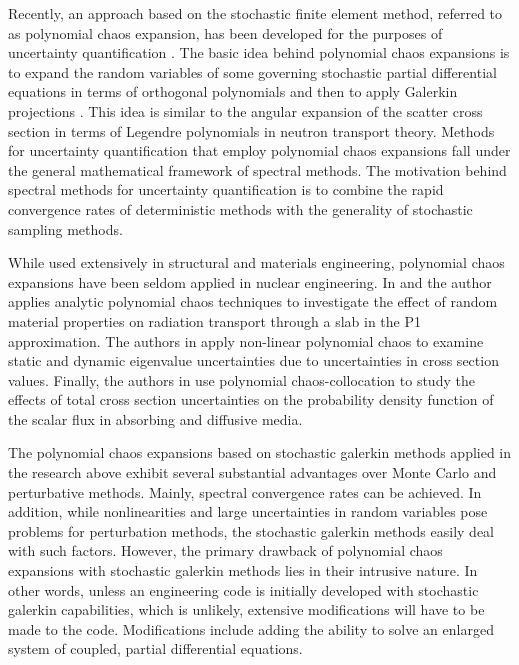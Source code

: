 Recently, an approach based on the stochastic finite element method, referred to as polynomial chaos expansion, has been developed for the purposes of uncertainty quantification \cite{Ghanem_Spanos}. The basic idea behind polynomial chaos expansions is to expand the random variables of some governing stochastic partial differential equations in terms of orthogonal polynomials and then to apply Galerkin projections \cite{LeMaitreKnio}. This idea is similar to the angular expansion of the scatter cross section in terms of Legendre polynomials in neutron transport theory. Methods for uncertainty quantification that employ polynomial chaos expansions fall under the general mathematical framework of spectral methods. The motivation behind spectral methods for uncertainty quantification is to combine the rapid convergence rates of deterministic methods with the generality of stochastic sampling methods. 

While used extensively in structural and materials engineering, polynomial chaos expansions have been seldom applied in nuclear engineering. In \cite{MMR_Williams1} and \cite{MMR_Williams2} the author applies analytic polynomial chaos techniques to investigate the effect of random material properties on radiation transport through a slab in the P1 approximation. The authors in \cite{Ayres_Williams_Eaton} apply non-linear polynomial chaos to examine static and dynamic eigenvalue uncertainties due to uncertainties in cross section values. Finally, the authors in \cite{Fichtl_Prinja} use polynomial chaos-collocation to study the effects of total cross section uncertainties on the probability density function of the scalar flux in absorbing and diffusive media.    

The polynomial chaos expansions based on stochastic galerkin methods applied in the research above exhibit several substantial advantages over Monte Carlo and perturbative methods. Mainly, spectral convergence rates can be achieved. In addition, while nonlinearities and large uncertainties in random variables pose problems for perturbation methods, the stochastic galerkin methods easily deal with such factors. However, the primary drawback of polynomial chaos expansions with stochastic galerkin methods lies in their intrusive nature. In other words, unless an engineering code is initially developed with stochastic galerkin capabilities, which is unlikely, extensive modifications will have to be made to the code. Modifications include adding the ability to solve an enlarged system of coupled, partial differential equations.      


